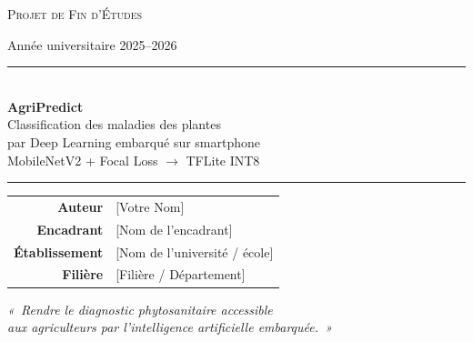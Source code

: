 \documentclass[12pt, a4paper, twoside]{report}
\begin{document}
\begin{titlepage}
\centering

\vspace*{1cm}

{\Large\scshape Projet de Fin d'Études\par}
\vspace{0.5cm}
{\large Année universitaire 2025--2026\par}

\vspace{2cm}

\rule{\textwidth}{1.5pt}\\[0.4cm]
{\Huge\bfseries AgriPredict\\[0.3cm]}
{\LARGE Classification des maladies des plantes\\
par Deep Learning embarqué sur smartphone\\[0.3cm]}
{\Large MobileNetV2 + Focal Loss $\longrightarrow$ TFLite INT8}\\[0.4cm]
\rule{\textwidth}{1.5pt}

\vspace{2cm}

{\large
\begin{tabular}{rl}
\textbf{Auteur}       & [Votre Nom] \\
\textbf{Encadrant}    & [Nom de l'encadrant] \\
\textbf{Établissement}& [Nom de l'université / école] \\
\textbf{Filière}      & [Filière / Département] \\
\end{tabular}
}

\vfill

{\large\itshape
«~Rendre le diagnostic phytosanitaire accessible\\
aux agriculteurs par l'intelligence artificielle embarquée.~»}

\vspace{1cm}


\end{titlepage}


\end{document}
